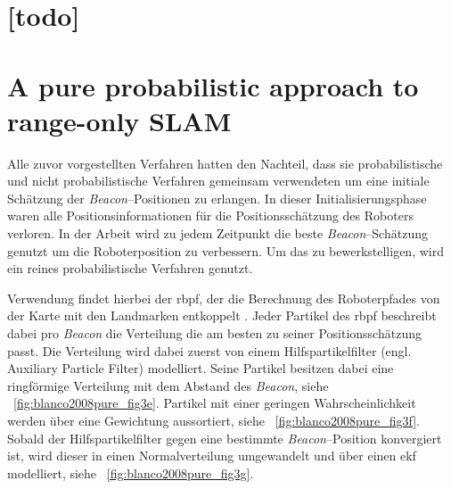 \begin{comment}
------------------------------------------------------------------------------------------
- Tracking moving devices with the cricket location system (547)
\end{comment}
\section{ [todo]}


\begin{comment}
------------------------------------------------------------------------------------------
\end{comment}
\section{A pure probabilistic approach to range-only SLAM}\label{sec:blanco2008pure}

Alle zuvor vorgestellten Verfahren hatten den Nachteil, dass sie probabilistische und nicht probabilistische Verfahren gemeinsam verwendeten um eine initiale Schätzung der \textit{Beacon}--Positionen zu erlangen. In dieser Initialisierungsphase waren alle Positionsinformationen für die Positionsschätzung des Roboters verloren. In der Arbeit \cite{blanco2008pure} wird zu jedem Zeitpunkt die beste \textit{Beacon}--Schätzung genutzt um die Roboterposition zu verbessern. Um das zu bewerkstelligen, wird ein reines probabilistische Verfahren genutzt.

Verwendung findet hierbei der \Gls{rbpf}, der die Berechnung des Roboterpfades von der Karte mit den Landmarken entkoppelt \cite{murphy2001rao, montemerlo2002fastslam}. Jeder Partikel des \Gls{rbpf} beschreibt dabei pro \textit{Beacon} die Verteilung die am besten zu seiner Positionsschätzung passt. Die Verteilung wird dabei zuerst von einem Hilfspartikelfilter (engl. Auxiliary Particle Filter) modelliert. Seine Partikel besitzen dabei eine ringförmige Verteilung mit dem Abstand des \textit{Beacon}, siehe \figurename~\ref{fig:blanco2008pure_fig3e}. Partikel mit einer geringen Wahrscheinlichkeit werden über eine Gewichtung aussortiert, siehe \figurename~\ref{fig:blanco2008pure_fig3f}. Sobald der Hilfspartikelfilter gegen eine bestimmte \textit{Beacon}--Position konvergiert ist, wird dieser in einen Normalverteilung umgewandelt und über einen \Gls{ekf} modelliert, siehe \figurename~\ref{fig:blanco2008pure_fig3g}.

